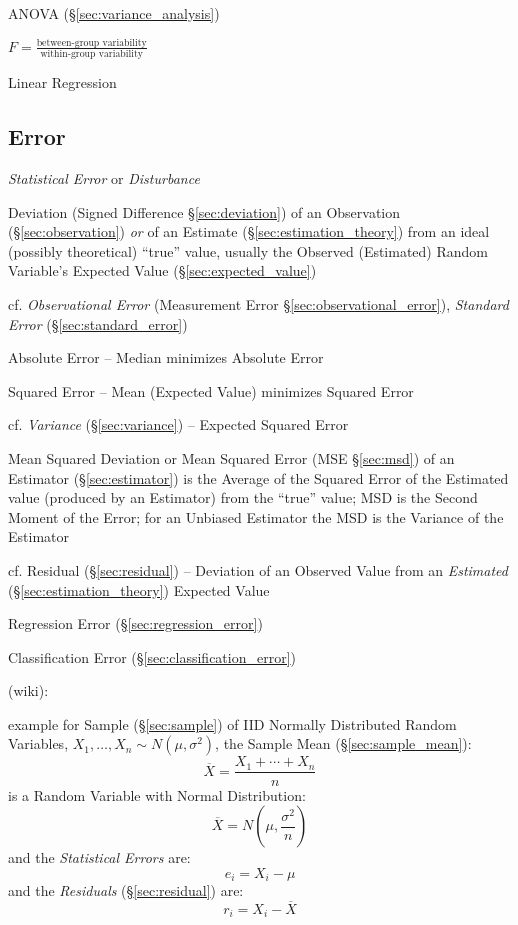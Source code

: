 ANOVA (\S\ref{sec:variance_analysis})

$F = \frac{\text{between-group variability}}{\text{within-group variability}}$

Linear Regression



\subsection{Error}\label{sec:error}

\emph{Statistical Error} or \emph{Disturbance}

Deviation (Signed Difference \S\ref{sec:deviation}) of an Observation
(\S\ref{sec:observation}) \emph{or} of an Estimate
(\S\ref{sec:estimation_theory}) from an ideal (possibly theoretical) ``true''
value, usually the Observed (Estimated) Random Variable's Expected Value
(\S\ref{sec:expected_value})

\fist cf. \emph{Observational Error} (Measurement Error
\S\ref{sec:observational_error}), \emph{Standard Error}
  (\S\ref{sec:standard_error})

Absolute Error -- Median minimizes Absolute Error

Squared Error -- Mean (Expected Value) minimizes Squared Error

cf. \emph{Variance} (\S\ref{sec:variance}) -- Expected Squared Error

\fist Mean Squared Deviation or Mean Squared Error (MSE \S\ref{sec:msd}) of an
Estimator (\S\ref{sec:estimator}) is the Average of the Squared Error of the
Estimated value (produced by an Estimator) from the ``true'' value; MSD is
the Second Moment of the Error; for an Unbiased Estimator the MSD is the
Variance of the Estimator

cf. Residual (\S\ref{sec:residual}) -- Deviation of an Observed Value from an
\emph{Estimated} (\S\ref{sec:estimation_theory}) Expected Value

\fist Regression Error (\S\ref{sec:regression_error})

\fist Classification Error (\S\ref{sec:classification_error})

(wiki):

example for Sample (\S\ref{sec:sample}) of IID Normally Distributed Random
Variables, $X_1, \ldots, X_n \sim N(\mu, \sigma^2)$, the Sample Mean
(\S\ref{sec:sample_mean}):
\[
  \overline{X} = \frac{X_1 + \cdots + X_n}{n}
\]
is a Random Variable with Normal Distribution:
\[
  \overline{X} = N(\mu, \frac{\sigma^2}{n})
\]
and the \emph{Statistical Errors} are:
\[
  e_i = X_i - \mu
\]
and the \emph{Residuals} (\S\ref{sec:residual}) are:
\[
  r_i = X_i - \overline{X}
\]



